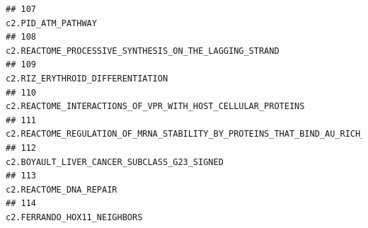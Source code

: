 \documentclass{article}\usepackage[]{graphicx}\usepackage[]{color}
\makeatletter
\newenvironment{kframe}{%
 \def\at@end@of@kframe{}%
 \ifinner\ifhmode%
  \def\at@end@of@kframe{\end{minipage}}%
  \begin{minipage}{\columnwidth}%
 \fi\fi%
 \def\FrameCommand##1{\hskip\@totalleftmargin \hskip-\fboxsep
 \colorbox{shadecolor}{##1}\hskip-\fboxsep
     \hskip-\linewidth \hskip-\@totalleftmargin \hskip\columnwidth}%
 \MakeFramed {\advance\hsize-\width
   \@totalleftmargin\z@ \linewidth\hsize
   \@setminipage}}%
 {\par\unskip\endMakeFramed%
 \at@end@of@kframe}
\newenvironment{knitrout}{}{} %
\makeatother
\begin{document}
\begin{knitrout}
\begin{kframe}
\begin{verbatim}
## 107                                                                                                                                                                                                                                                                                                                                    c2.PID_ATM_PATHWAY
## 108                                                                                                                                                                                                                                                                                                c2.REACTOME_PROCESSIVE_SYNTHESIS_ON_THE_LAGGING_STRAND
## 109                                                                                                                                                                                                                                                                                                                      c2.RIZ_ERYTHROID_DIFFERENTIATION
## 110                                                                                                                                                                                                                                                                                           c2.REACTOME_INTERACTIONS_OF_VPR_WITH_HOST_CELLULAR_PROTEINS
## 111                                                                                                                                                                                                                                                                       c2.REACTOME_REGULATION_OF_MRNA_STABILITY_BY_PROTEINS_THAT_BIND_AU_RICH_ELEMENTS
## 112                                                                                                                                                                                                                                                                                                           c2.BOYAULT_LIVER_CANCER_SUBCLASS_G23_SIGNED
## 113                                                                                                                                                                                                                                                                                                                                c2.REACTOME_DNA_REPAIR
## 114                                                                                                                                                                                                                                                                                                                           c2.FERRANDO_HOX11_NEIGHBORS

\end{verbatim}
\end{kframe}
\end{knitrout}
\end{document}
